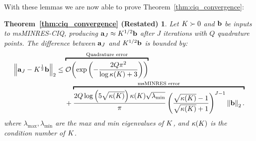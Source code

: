With these lemmas we are now able to prove Theorem~\ref{thm:ciq_convergence}:
%
\newtheorem*{ciq_convergence}{Theorem~\ref{thm:ciq_convergence} (Restated)}
\begin{ciq_convergence}
  Let $K \succ 0$ and $\mathbf{b}$ be inputs to msMINRES-CIQ, producing $\mathbf{a}_J \approx K^{1/2} \mathbf{b}$ after $J$ iterations with $Q$ quadrature points.
  The difference between $\mathbf{a}_J$ and $K^{1/2} \mathbf{b}$ is bounded by:
  \begin{align*}
    \left\Vert \ba_J - \bK^{\frac 1 2} \bb \right\Vert_2
    &\leq
    \overbracket{
      \bigo{\exp\left( -\frac  {2 Q \pi^2}{\log \kappa(\bK) + 3} \right)}
    }^{\text{Quadrature error}}
    \\
    &\phantom{=} \:\: +
    \overbracket{
      \frac{ 2 Q \log \left( 5 \sqrt{\kappa(\bK)} \right) \kappa(\bK) \sqrt{\lambda_\text{min}} }{\pi}
      \left( \frac{ \sqrt{\kappa(\bK)} - 1}{ \sqrt{\kappa(\bK)} + 1} \right)^{J-1}
      \left\Vert \bb \right\Vert_2.
    }^{\text{msMINRES error}}
  \end{align*}
  where $\lambda_\text{max},\lambda_{\text{min}}$ are the max and min eigenvalues of $K$, and $\kappa(K)$ is the condition number of $K$.
\end{ciq_convergence}
%
